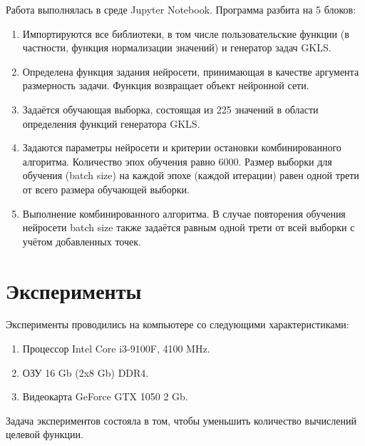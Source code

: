 \documentclass[11pt, oneside, a4paper]{article}
\begin{document}
Работа выполнялась в среде Jupyter Notebook. Программа разбита на 5 блоков:
\begin{enumerate}
\item Импортируются все библиотеки, в том числе пользовательские функции (в частности, функция нормализации значений) и генератор задач GKLS. 
\item Определена функция задания нейросети, принимающая в качестве аргумента размерность задачи. Функция возвращает объект нейронной сети.
\item Задаётся обучающая выборка, состоящая из 225 значений в области определения функций генератора GKLS.
\item Задаются параметры нейросети и критерии остановки комбинированного алгоритма. Количество эпох обучения равно 6000. Размер выборки для обучения (batch size) на каждой эпохе (каждой итерации) равен одной трети от всего размера обучающей выборки.
\item Выполнение комбинированного алгоритма. В случае повторения обучения нейросети batch size также задаётся равным одной трети от всей выборки с учётом добавленных точек.
\end{enumerate}

\section{Эксперименты}
Эксперименты проводились на компьютере со следующими характеристиками:
\begin{enumerate}
\item Процессор Intel Core i3-9100F, 4100 MHz.
\item ОЗУ 16 Gb (2x8 Gb) DDR4.
\item Видеокарта GeForce GTX 1050 2 Gb.
\end{enumerate}

Задача экспериментов состояла в том, чтобы уменьшить количество вычислений целевой функции. 
\end{document}
